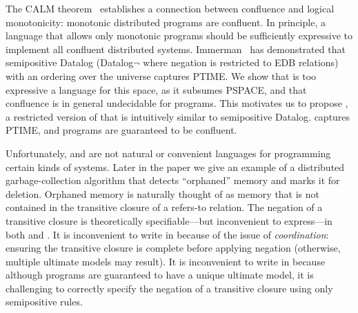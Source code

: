 The CALM theorem~\cite{cidr11, relational-transducers, declarative-imperative} establishes a connection between confluence
and logical monotonicity: monotonic distributed programs are confluent.  In principle, a language that allows only
monotonic programs should be sufficiently expressive to implement all confluent distributed systems.
Immerman~\cite{immerman-ptime} has demonstrated that semipositive Datalog (Datalog$\lnot$ where negation is restricted to EDB relations) with an ordering over the universe captures PTIME.
We show that \lang is too expressive a language for this space, as it subsumes PSPACE, and that confluence is in general
undecidable for \lang programs.  This motivates us to propose \slang, a restricted version of \lang that is intuitively similar to semipositive Datalog.  \slang captures PTIME, and \slang programs are guaranteed to be confluent.

Unfortunately, \lang and \slang are not natural or convenient languages for
programming certain kinds of systems.  Later in the paper we give an example of
a distributed garbage-collection algorithm that detects ``orphaned'' memory and
marks it for deletion.  Orphaned memory is naturally thought of as memory that
is not contained in the transitive closure of a refers-to relation.  The
negation of a transitive closure is theoretically specifiable---but inconvenient
to express---in both \lang and \slang.  It is inconvenient to write in \lang
because of the issue of {\em coordination}: ensuring the transitive closure is
complete before applying negation (otherwise, multiple ultimate models may
result).  It is inconvenient to write in \slang because although \slang programs
are guaranteed to have a unique ultimate model, it is challenging to correctly
specify the negation of a transitive closure using only semipositive rules.


